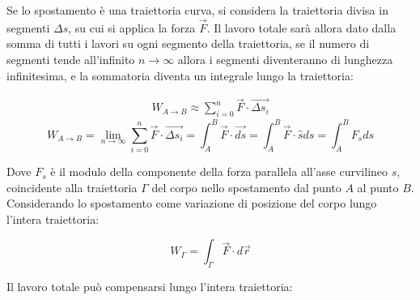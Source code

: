 \documentclass{article}
\numberwithin{equation}{subsection}
\begin{document}
Se lo spostamento è una traiettoria curva, si considera la 
traiettoria divisa in segmenti $\Delta s$, su cui si 
applica la forza $\vec{F}$. Il lavoro totale sarà allora dato 
dalla somma di tutti i lavori su ogni segmento della 
traiettoria, se il numero di segmenti tende all'infinito $n\to\infty$ 
allora i segmenti diventeranno di lunghezza infinitesima, e la 
sommatoria diventa un integrale lungo la traiettoria:

\begin{gather*}
    \displaystyle W_{A\to B}\approx\sum_{i=0}^{n}\vec{F}\cdot\vec{\Delta s_i}
\end{gather*}   
\begin{equation}
    W_{A\to B}=\lim_{n\to\infty}\sum_{i=0}^{n}\vec{F}\cdot\vec{\Delta s_i}=\int_{A}^{B}\vec{F}\cdot\vec{ds}=\int_{A}^{B}\vec{F}\cdot\hat{s}ds=\int_{A}^{B}F_sds
\end{equation}

Dove $F_s$ è il modulo della componente della forza parallela 
all'asse curvilineo $s$, coincidente alla traiettoria $\Gamma$ 
del corpo nello spostamento dal punto $A$ al punto $B$.
Considerando lo spostamento come variazione di posizione 
del corpo lungo l'intera traiettoria:

\begin{equation}
    \displaystyle W_{\Gamma}=\int_{\Gamma}\vec{F}\cdot d\vec{r}
\end{equation}

\begin{center}\end{center}


Il lavoro totale può compensarsi lungo l'intera 
traiettoria:
\begin{center}\end{center}
\end{document}
